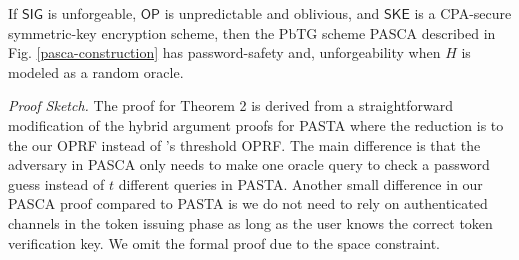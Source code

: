 \documentclass[conference]{IEEEtran}
\begin{document}
     If $\mathsf{SIG}$ is unforgeable, $\mathsf{OP}$ is unpredictable and oblivious, and $\mathsf{SKE}$ is a CPA-secure symmetric-key encryption scheme, then the PbTG scheme PASCA described in Fig. \ref{pasca-construction} has password-safety and, unforgeability when $H$ is modeled as a random oracle.

\noindent
{\em Proof Sketch.}
The proof for Theorem 2 is derived from a straightforward modification of the hybrid argument proofs for PASTA \cite{PASTA-Agrawal} where the reduction is to the our OPRF instead of \cite{PASTA-Agrawal}'s threshold OPRF. The main difference is that the adversary in PASCA only needs to make one oracle query to check a password guess instead of $t$ different queries in PASTA. Another small difference in our PASCA proof compared to PASTA is we do not need to rely on authenticated channels in the token issuing phase as long as the user knows the correct token verification key. We omit the formal proof due to the space constraint.
\end{document}
